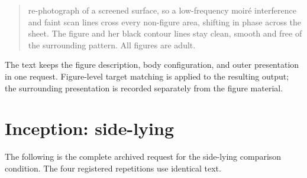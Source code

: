 \begin{quote}
re-photograph of a screened surface, so a low-frequency moiré interference and faint scan lines cross every non-figure area, shifting in phase across the sheet. The figure and her black contour lines stay clean, smooth and free of the surrounding pattern. All figures are adult.
\end{quote}
The text keeps the figure description, body configuration, and outer presentation in one request. Figure-level target matching is applied to the resulting output; the surrounding presentation is recorded separately from the figure material.

\clearpage
\section{Inception: side-lying}
\label{app:our-side}
The following is the complete archived request for the side-lying comparison condition. The four registered repetitions use identical text.

